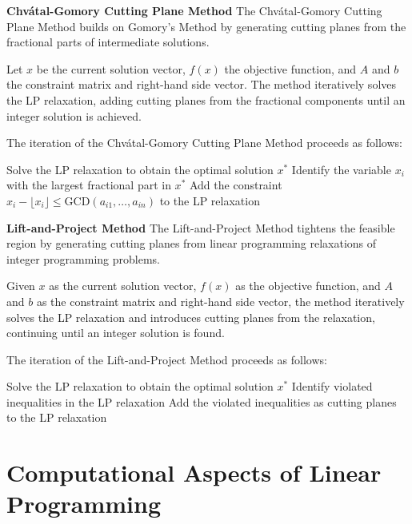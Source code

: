 \documentclass[12pt]{book} %
\begin{document}
\textbf{Chvátal-Gomory Cutting Plane Method}
\FloatBarrier
The Chvátal-Gomory Cutting Plane Method builds on Gomory's Method by generating cutting planes from the fractional parts of intermediate solutions.

Let \(x\) be the current solution vector, \(f(x)\) the objective function, and \(A\) and \(b\) the constraint matrix and right-hand side vector. The method iteratively solves the LP relaxation, adding cutting planes from the fractional components until an integer solution is achieved.


The iteration of the Chvátal-Gomory Cutting Plane Method proceeds as follows:
\FloatBarrier
\begin{algorithm}[H]
\caption{Chvátal-Gomory Cutting Plane Method}
\begin{algorithmic}[1]
\State Solve the LP relaxation to obtain the optimal solution \(x^*\)
\State Identify the variable \(x_i\) with the largest fractional part in \(x^*\)
\State Add the constraint \(x_i - \lfloor x_i \rfloor \leq \text{{GCD}}(a_{i1}, \ldots, a_{in})\) to the LP relaxation
\EndIf
\end{algorithmic}
\end{algorithm}
\FloatBarrier

\textbf{Lift-and-Project Method}
The Lift-and-Project Method tightens the feasible region by generating cutting planes from linear programming relaxations of integer programming problems.

Given \(x\) as the current solution vector, \(f(x)\) as the objective function, and \(A\) and \(b\) as the constraint matrix and right-hand side vector, the method iteratively solves the LP relaxation and introduces cutting planes from the relaxation, continuing until an integer solution is found.

The iteration of the Lift-and-Project Method proceeds as follows:
\FloatBarrier
\begin{algorithm}[H]
\caption{Lift-and-Project Method}
\begin{algorithmic}[1]
\State Solve the LP relaxation to obtain the optimal solution \(x^*\)
\State Identify violated inequalities in the LP relaxation
\State Add the violated inequalities as cutting planes to the LP relaxation
\EndIf
\end{algorithmic}
\end{algorithm}


\section{Computational Aspects of Linear Programming}
\end{document}
